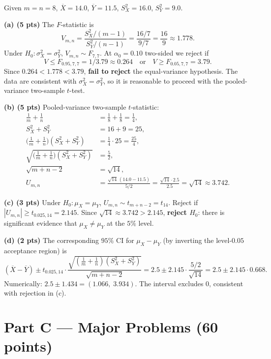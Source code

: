 \documentclass[11pt]{article}
\begin{document}
Given $m = n = 8$, $\overline{X} = 14.0$, $\overline{Y} = 11.5$, $S_X^2 = 16.0$, $S_Y^2 = 9.0$.

\textbf{(a) (5 pts)} The $F$-statistic is
\[
    V_{m,n} = \frac{S_X^2/(m-1)}{S_Y^2/(n-1)} = \frac{16/7}{9/7} = \frac{16}{9} \approx 1.778.
\]
Under $H_0\!: \sigma_X^2 = \sigma_Y^2$, $V_{m,n} \sim F_{7,7}$. At $\alpha_0 = 0.10$ two-sided we reject if
\[
    V \le F_{0.95, 7, 7} = 1/3.79 \approx 0.264 \quad\text{or}\quad V \ge F_{0.05, 7, 7} = 3.79.
\]
Since $0.264 < 1.778 < 3.79$, \textbf{fail to reject} the equal-variance hypothesis. The data are consistent with $\sigma_X^2 = \sigma_Y^2$, so it is reasonable to proceed with the pooled-variance two-sample $t$-test.

\textbf{(b) (5 pts)} Pooled-variance two-sample $t$-statistic:
\begin{align*}
    \tfrac{1}{m} + \tfrac{1}{n} &= \tfrac{1}{8} + \tfrac{1}{8} = \tfrac{1}{4}, \\
    S_X^2 + S_Y^2 &= 16 + 9 = 25, \\
    \bigl(\tfrac{1}{m} + \tfrac{1}{n}\bigr)(S_X^2 + S_Y^2) &= \tfrac{1}{4}\cdot 25 = \tfrac{25}{4}, \\
    \sqrt{\bigl(\tfrac{1}{m} + \tfrac{1}{n}\bigr)(S_X^2 + S_Y^2)} &= \tfrac{5}{2}, \\
    \sqrt{m+n-2} &= \sqrt{14}, \\
    U_{m,n} &= \frac{\sqrt{14}\,(14.0 - 11.5)}{5/2} = \frac{\sqrt{14}\cdot 2.5}{2.5} = \sqrt{14} \approx 3.742.
\end{align*}

\textbf{(c) (3 pts)} Under $H_0\!: \mu_X = \mu_Y$, $U_{m,n} \sim t_{m+n-2} = t_{14}$. Reject if $|U_{m,n}| \ge t_{0.025, 14} = 2.145$. Since $\sqrt{14} \approx 3.742 > 2.145$, \textbf{reject $H_0$}: there is significant evidence that $\mu_X \neq \mu_Y$ at the $5\%$ level.

\textbf{(d) (2 pts)} The corresponding $95\%$ CI for $\mu_X - \mu_Y$ (by inverting the level-$0.05$ acceptance region) is
\[
    (\overline{X} - \overline{Y}) \pm t_{0.025, 14} \cdot \frac{\sqrt{(\tfrac{1}{m}+\tfrac{1}{n})(S_X^2 + S_Y^2)}}{\sqrt{m+n-2}}
    = 2.5 \pm 2.145 \cdot \frac{5/2}{\sqrt{14}}
    = 2.5 \pm 2.145 \cdot 0.668.
\]
Numerically: $2.5 \pm 1.434 = (1.066,\; 3.934)$. The interval excludes $0$, consistent with rejection in (c).

\newpage
\section*{Part C --- Major Problems (60 points)}
\end{document}
